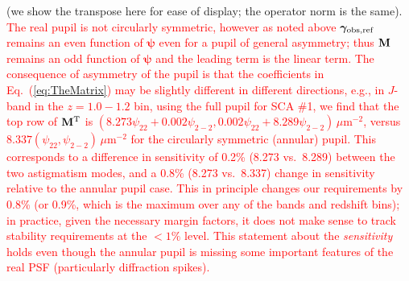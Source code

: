 \documentclass[usenatbib]{mnras}
\newcommand{\changetext}[1]{\textcolor{red}{#1}}
\begin{document}
(we show the transpose here for ease of display; the operator norm is the same). \changetext{The real pupil is not circularly symmetric, however as noted above ${\boldsymbol\gamma}_{\rm obs,ref}$ remains an even function of ${\boldsymbol\psi}$ even for a pupil of general asymmetry; thus ${\bf M}$ remains an odd function of ${\boldsymbol\psi}$ and the leading term is the linear term. The consequence of asymmetry of the pupil is that the coefficients in Eq.~(\ref{eq:TheMatrix}) may be slightly different in different directions, e.g., in $J$-band in the $z=1.0-1.2$ bin, using the full pupil for SCA \#1, we find that the top row of ${\bf M}^{\rm T}$ is $(8.273\psi_{22}+0.002\psi_{2-2}, 0.002\psi_{22}+8.289\psi_{2-2})\,\mu$m$^{-2}$, versus $8.337(\psi_{22},\psi_{2-2})\,\mu$m$^{-2}$ for the circularly symmetric (annular) pupil. This corresponds to a difference in sensitivity of 0.2\% (8.273 vs.\ 8.289) between the two astigmatism modes, and a 0.8\% (8.273 vs.\ 8.337) change in sensitivity relative to the annular pupil case. This in principle changes our requirements by 0.8\% (or 0.9\%, which is the maximum over any of the bands and redshift bins); in practice, given the necessary margin factors, it does not make sense to track stability requirements at the $<1\%$ level. This statement about the {\em sensitivity} holds even though the annular pupil is missing some important features of the real PSF (particularly diffraction spikes).}
\end{document}
